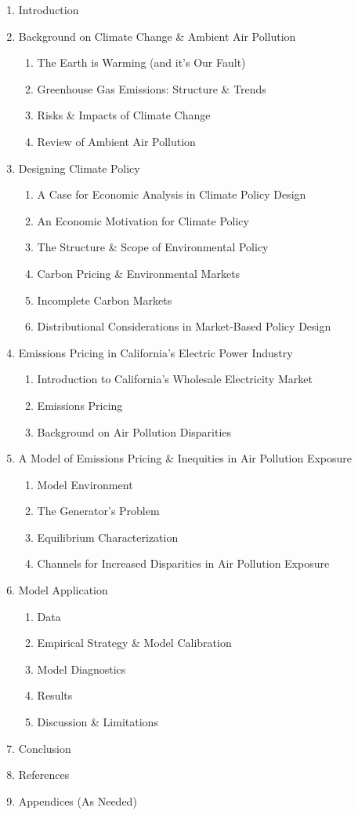 \documentclass[11pt]{article}
\begin{document}
\begin{enumerate}
	\item Introduction
	\item Background on Climate Change \& Ambient Air Pollution
	\begin{enumerate}
		\item The Earth is Warming (and it's Our Fault)
		\item Greenhouse Gas Emissions: Structure \& Trends
		\item Risks \& Impacts of Climate Change
		\item Review of Ambient Air Pollution
	\end{enumerate}
	\item Designing Climate Policy
	\begin{enumerate}
		\item A Case for Economic Analysis in Climate Policy Design
		\item An Economic Motivation for Climate Policy
		\item The Structure \& Scope of Environmental Policy
		\item Carbon Pricing \& Environmental Markets
		\item Incomplete Carbon Markets
		\item Distributional Considerations in Market-Based Policy Design
	\end{enumerate}
	\item Emissions Pricing in California's Electric Power Industry
	\begin{enumerate}
		\item Introduction to California's Wholesale Electricity Market
		\item Emissions Pricing 
		\item Background on Air Pollution Disparities
	\end{enumerate}
	\item A Model of Emissions Pricing \& Inequities in Air Pollution Exposure
	\begin{enumerate}
		\item Model Environment
		\item The Generator's Problem
		\item Equilibrium Characterization
		\item Channels for Increased Disparities in Air Pollution Exposure
	\end{enumerate}
	\item Model Application
	\begin{enumerate}
		\item Data
		\item Empirical Strategy \& Model Calibration
		\item Model Diagnostics
		\item Results
		\item Discussion \& Limitations
	\end{enumerate}
	\item Conclusion
	\item References
	\item Appendices (As Needed)
\end{enumerate}


\end{document}
